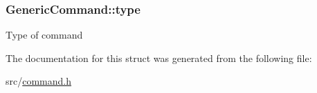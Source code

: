 \subsubsection[{\texorpdfstring{type}{type}}]{ Generic\+Command\+::type}\hypertarget{structGenericCommand_af50a1b4b5724e01b97f4755627de108e}{}\label{structGenericCommand_af50a1b4b5724e01b97f4755627de108e}
Type of command 

The documentation for this struct was generated from the following file\+:\begin{DoxyCompactItemize}
\item 
src/\hyperlink{command_8h}{command.\+h}\end{DoxyCompactItemize}
